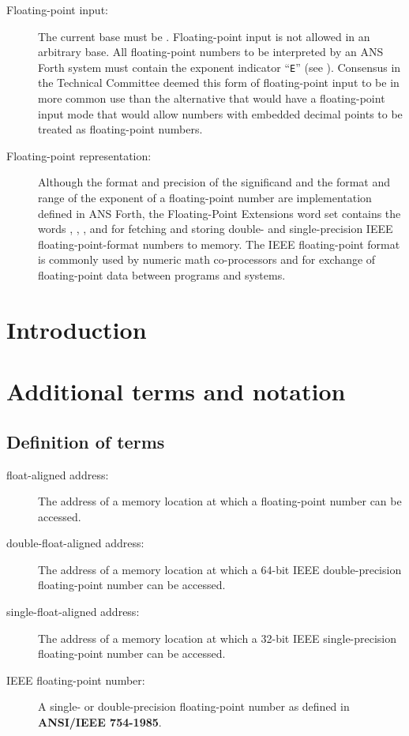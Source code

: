\begin{info}
\begin{description}
\item[Floating-point input:]
	The current base must be . Floating-point input
	is not allowed in an arbitrary base. All floating-point numbers to
	be interpreted by an ANS Forth system must contain the exponent
	indicator ``\texttt{E}'' (see ). Consensus in the Technical
	Committee deemed this form of floating-point input to be in more
	common use than the alternative that would have a floating-point
	input mode that would allow numbers with embedded decimal points
	to be treated as floating-point numbers.

\item[Floating-point representation:]
	Although the format and precision of the significand and the format
	and range of the exponent of a floating-point number are
	implementation defined in ANS Forth, the Floating-Point Extensions
	word set contains the words
	, , , and 
	for fetching and storing double- and single-precision IEEE
	floating-point-format numbers to memory. The IEEE floating-point
	format is commonly used by numeric math co-processors and for
	exchange of floating-point data between programs and systems.
\end{description}

\end{info}

\section{Introduction} %

\section{Additional terms and notation} %

\subsection{Definition of terms} %
\label{float:terms}

\begin{description}
\item[float-aligned address:]
	The address of a memory location at which a floating-point
	number can be accessed.

\item[double-float-aligned address:]
	The address of a memory location at which a 64-bit IEEE
	double-precision floating-point number can be accessed.

\item[single-float-aligned address:]
	The address of a memory location at which a 32-bit IEEE
	single-precision floating-point number can be accessed.

\item[IEEE floating-point number:]
	A single- or double-precision floating-point number as defined
	in \textbf{ANSI/IEEE 754-1985}.
\end{description}

